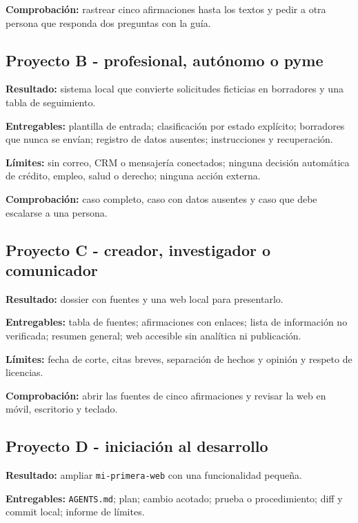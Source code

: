 \documentclass[10pt,a4paper,openany]{book}
\begin{document}
\textbf{Comprobación:} rastrear cinco afirmaciones hasta los textos y
pedir a otra persona que responda dos preguntas con la guía.

\subsection{Proyecto B - profesional, autónomo o
pyme}\label{proyecto-b---profesional-autuxf3nomo-o-pyme}

\textbf{Resultado:} sistema local que convierte solicitudes ficticias en
borradores y una tabla de seguimiento.

\textbf{Entregables:} plantilla de entrada; clasificación por estado
explícito; borradores que nunca se envían; registro de datos ausentes;
instrucciones y recuperación.

\textbf{Límites:} sin correo, CRM o mensajería conectados; ninguna
decisión automática de crédito, empleo, salud o derecho; ninguna acción
externa.

\textbf{Comprobación:} caso completo, caso con datos ausentes y caso que
debe escalarse a una persona.

\subsection{Proyecto C - creador, investigador o
comunicador}\label{proyecto-c---creador-investigador-o-comunicador}

\textbf{Resultado:} dossier con fuentes y una web local para
presentarlo.

\textbf{Entregables:} tabla de fuentes; afirmaciones con enlaces; lista
de información no verificada; resumen general; web accesible sin
analítica ni publicación.

\textbf{Límites:} fecha de corte, citas breves, separación de hechos y
opinión y respeto de licencias.

\textbf{Comprobación:} abrir las fuentes de cinco afirmaciones y revisar
la web en móvil, escritorio y teclado.

\subsection{Proyecto D - iniciación al
desarrollo}\label{proyecto-d---iniciaciuxf3n-al-desarrollo}

\textbf{Resultado:} ampliar \texttt{mi-primera-web} con una
funcionalidad pequeña.

\textbf{Entregables:} \texttt{AGENTS.md}; plan; cambio acotado; prueba o
procedimiento; diff y commit local; informe de límites.
\end{document}
